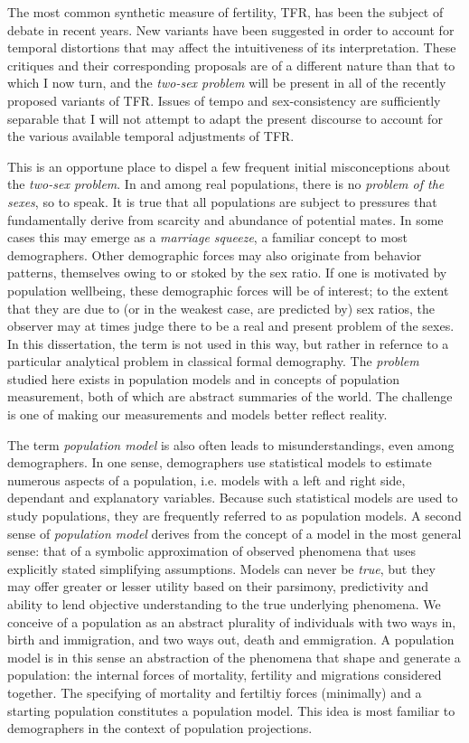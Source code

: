 \documentclass[reqno,12pt,oneside,a4paper]{report} %
\theoremstyle{plain}
\theoremstyle{definition}
\theoremstyle{remark}
\numberwithin{theorem}{chapter}     %
\begin{document}
The most common synthetic measure of fertility, TFR, has been the subject of debate in recent years. New variants have been suggested in order to account for temporal distortions that may affect the intuitiveness of its interpretation. These critiques and their corresponding proposals are of a different nature than that to which I now turn, and the \textit{two-sex problem} will be present in all of the recently proposed variants of TFR. Issues of tempo and sex-consistency are sufficiently separable that I will not attempt to adapt the present discourse to account for the various available temporal adjustments of TFR.

This is an opportune place to dispel a few frequent initial misconceptions about the \textit{two-sex problem}. In and among real populations, there is no \textit{problem of the sexes}, so to speak. It is true that all populations are subject to pressures that fundamentally derive from scarcity and abundance of potential mates. In some cases this may emerge as a \textit{marriage squeeze}, a familiar concept to most demographers. Other demographic forces may also originate from behavior patterns, themselves owing to or stoked by the sex ratio. If one is motivated by population wellbeing, these demographic forces will be of interest; to the extent that they are due to (or in the weakest case, are predicted by) sex ratios, the observer may at times judge there to be a real and present problem of the sexes. In this dissertation, the term is not used in this way, but rather in refernce to a particular analytical problem in classical formal demography. The \textit{problem} studied here exists in population models and in concepts of population measurement, both of which are abstract summaries of the world. The challenge is one of making our measurements and models better reflect reality.

The term \textit{population model} is also often leads to misunderstandings, even among demographers. In one sense, demographers use statistical models to estimate numerous aspects of a population, i.e. models with a left and right side, dependant and explanatory variables. Because such statistical models are used to study populations, they are frequently referred to as population models. A second sense of \textit{population model} derives from the concept of a model in the most general sense: that of a symbolic approximation of observed phenomena that uses explicitly stated simplifying assumptions. Models can never be \textit{true}, but they may offer greater or lesser utility based on their parsimony, predictivity and ability to lend objective understanding to the true underlying phenomena. We conceive of a population as an abstract plurality of individuals with two ways in, birth and immigration, and two ways out, death and emmigration. A population model is in this sense an abstraction of the phenomena that shape and generate a population: the internal forces of mortality, fertility and migrations considered together. The specifying of mortality and fertiltiy forces (minimally) and a starting population constitutes a population model. This idea is most familiar to demographers in the context of population projections.
\end{document}
